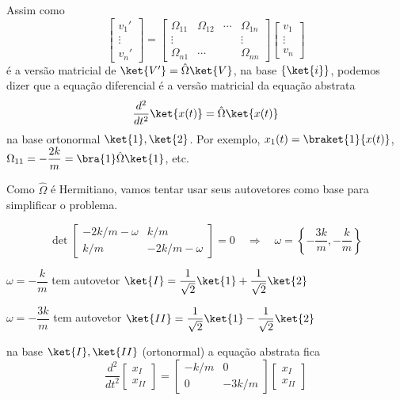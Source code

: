 Assim como
\[
\begin{bmatrix} v_1' \\ \vdots \\ v_n' \end{bmatrix}
=
\begin{bmatrix} \Omega_{11} & \Omega_{12} & \cdots & \Omega_{1n} \\ \vdots & & & \vdots \\ \Omega_{n1} & \cdots & & \Omega_{nn} \end{bmatrix}
\begin{bmatrix} v_1 \\ \vdots \\ v_n \end{bmatrix}
\]
é a versão matricial de $\ket{V'} = \hat{\Omega}\ket{V}$, na base $\{\ket{i}\}$, podemos dizer que a equação diferencial é a versão matricial da equação abstrata
\begin{equation}
    \frac{d^2}{dt^2}\ket{x(t)} = \hat{\Omega}\ket{x(t)}
\end{equation}
na base ortonormal $\ket{1}, \ket{2}$. Por exemplo, $x_1(t) = \braket{1}{x(t)}$, $\Omega_{11} = -\dfrac{2k}{m} = \bra{1}\hat{\Omega}\ket{1}$, etc.

Como $\hat{\Omega}$ é Hermitiano, vamos tentar usar seus autovetores como base para simplificar o problema.

\begin{equation}
    \det \begin{bmatrix} -2k/m - \omega & k/m \\ k/m & -2k/m - \omega \end{bmatrix} = 0
    \quad \Longrightarrow \quad
    \omega = \left\{ -\frac{3k}{m}, -\frac{k}{m} \right\}
\end{equation}

$\omega = -\dfrac{k}{m}$ tem autovetor $\ket{I} = \dfrac{1}{\sqrt{2}}\ket{1} + \dfrac{1}{\sqrt{2}}\ket{2}$

$\omega = -\dfrac{3k}{m}$ tem autovetor $\ket{II} = \dfrac{1}{\sqrt{2}}\ket{1} - \dfrac{1}{\sqrt{2}}\ket{2}$

na base $\ket{I}, \ket{II}$ (ortonormal) a equação abstrata fica
\begin{equation}
    \frac{d^2}{dt^2} \begin{bmatrix} x_I \\ x_{II} \end{bmatrix}
    =
    \begin{bmatrix} -k/m & 0 \\ 0 & -3k/m \end{bmatrix}
    \begin{bmatrix} x_I \\ x_{II} \end{bmatrix}
\end{equation}

